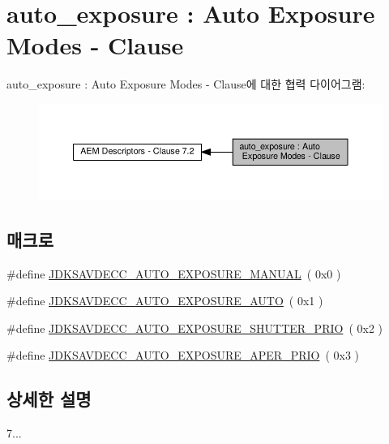 \hypertarget{group__auto__exposure}{}\section{auto\+\_\+exposure \+: Auto Exposure Modes -\/ Clause}
\label{group__auto__exposure}
auto\+\_\+exposure \+: Auto Exposure Modes -\/ Clause에 대한 협력 다이어그램\+:
\nopagebreak
\begin{figure}[H]
\begin{center}
\leavevmode
\includegraphics[width=350pt]{group__auto__exposure}
\end{center}
\end{figure}
\subsection*{매크로}
\begin{DoxyCompactItemize}
\item 
\#define \hyperlink{group__auto__exposure_gaad6b315aa73fd5a3fba37f59aebe4fbb}{J\+D\+K\+S\+A\+V\+D\+E\+C\+C\+\_\+\+A\+U\+T\+O\+\_\+\+E\+X\+P\+O\+S\+U\+R\+E\+\_\+\+M\+A\+N\+U\+AL}~( 0x0 )
\item 
\#define \hyperlink{group__auto__exposure_ga653f9aa9b6cf9b44da022062c6a3dee5}{J\+D\+K\+S\+A\+V\+D\+E\+C\+C\+\_\+\+A\+U\+T\+O\+\_\+\+E\+X\+P\+O\+S\+U\+R\+E\+\_\+\+A\+U\+TO}~( 0x1 )
\item 
\#define \hyperlink{group__auto__exposure_ga9344eb93e89637cec950cefe5ad310ea}{J\+D\+K\+S\+A\+V\+D\+E\+C\+C\+\_\+\+A\+U\+T\+O\+\_\+\+E\+X\+P\+O\+S\+U\+R\+E\+\_\+\+S\+H\+U\+T\+T\+E\+R\+\_\+\+P\+R\+IO}~( 0x2 )
\item 
\#define \hyperlink{group__auto__exposure_ga1739b60890e47dfeb15956a0b2a0f43e}{J\+D\+K\+S\+A\+V\+D\+E\+C\+C\+\_\+\+A\+U\+T\+O\+\_\+\+E\+X\+P\+O\+S\+U\+R\+E\+\_\+\+A\+P\+E\+R\+\_\+\+P\+R\+IO}~( 0x3 )
\end{DoxyCompactItemize}


\subsection{상세한 설명}
7... 

